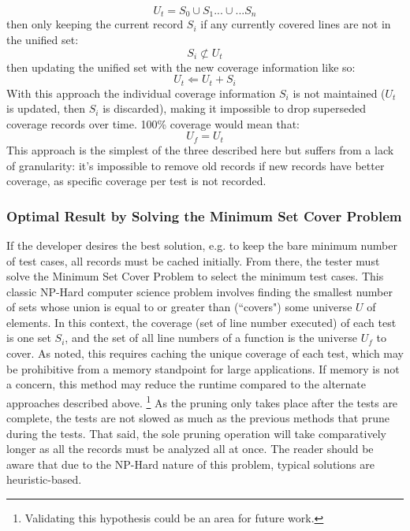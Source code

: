 \documentclass[10pt, conference]{IEEEtran}
\begin{document}
\begin{equation*}
  U_t = S_0 \cup S_1 ...\cup... S_n
\end{equation*}
then only keeping the current record $S_i$ if any currently 
covered lines are not in the unified set:
\begin{equation*}
  S_i \not \subset U_t
\end{equation*}
then updating the unified set with the new coverage information like so:
\begin{equation*}
  U_t \Leftarrow U_t + S_i
\end{equation*} 
With this approach the individual coverage information $S_i$ is not maintained 
($U_t$ is updated, then $S_i$ is discarded), making it impossible to drop superseded 
coverage records over time.  100\% coverage would mean that:
\begin{equation*}
  U_f = U_t
\end{equation*} 
This approach is the simplest of the three described here but suffers from a 
lack of granularity: it's impossible to remove old records if new records have 
better coverage, as specific coverage per test is not recorded.

\subsubsection{Optimal Result by Solving the Minimum Set Cover Problem}\label{sec:tuning-2}
If the developer desires the best solution, e.g. to keep the bare minimum
number of test cases, all records must be cached initially.  
From there, the tester must solve the Minimum Set Cover Problem
\cite{hassin2005better} to select the minimum test cases.
This classic NP-Hard computer science problem involves finding the smallest number
of sets whose union is equal to or greater than (“covers") some universe $U$ of elements.  
In this context, the coverage (set of line number executed) of each test is one set $S_i$,
and the set of all line numbers of a function is the universe $U_f$ to cover.  
As noted, this requires caching the unique coverage of each test, which may 
be prohibitive from a memory standpoint for large applications.
If memory is not a concern, this method may reduce the runtime 
compared to the alternate approaches described above. \footnote{Validating this hypothesis
could be an area for future work.} As the pruning 
only takes place after the tests are complete, the tests are not slowed as much
as the previous methods that prune during the tests.  That said, the sole
pruning operation will take comparatively longer as all the records must be 
analyzed all at once. The reader should be aware that due to the NP-Hard
nature of this problem, typical solutions are heuristic-based.
   
\end{document}
